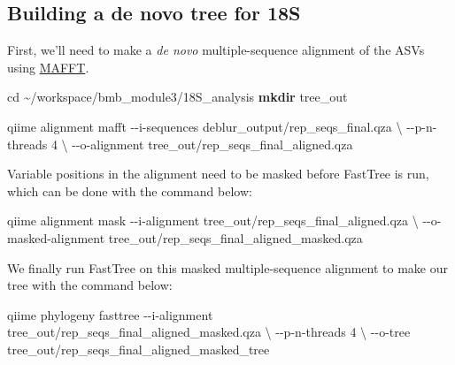 \documentclass[
]{book}
\newenvironment{Shaded}{\begin{snugshade}}{\end{snugshade}}
\newcommand{\AttributeTok}[1]{\textcolor[rgb]{0.13,0.29,0.53}{#1}}
\newcommand{\BuiltInTok}[1]{#1}
\newcommand{\DataTypeTok}[1]{\textcolor[rgb]{0.13,0.29,0.53}{#1}}
\newcommand{\ExtensionTok}[1]{#1}
\newcommand{\FunctionTok}[1]{\textcolor[rgb]{0.13,0.29,0.53}{\textbf{#1}}}
\newcommand{\NormalTok}[1]{#1}
\begin{document}
\subsection{Building a de novo tree for 18S}\label{building-a-de-novo-tree-for-18s}

First, we'll need to make a \emph{de novo} multiple-sequence alignment of the ASVs using \href{https://mafft.cbrc.jp/alignment/software/}{MAFFT}.

\begin{Shaded}
\begin{Highlighting}[]
\BuiltInTok{cd}\NormalTok{ \textasciitilde{}/workspace/bmb\_module3/18S\_analysis}
\FunctionTok{mkdir}\NormalTok{ tree\_out}

\ExtensionTok{qiime}\NormalTok{ alignment mafft }\AttributeTok{{-}{-}i{-}sequences}\NormalTok{ deblur\_output/rep\_seqs\_final.qza }\DataTypeTok{\textbackslash{}}
                      \AttributeTok{{-}{-}p{-}n{-}threads}\NormalTok{ 4 }\DataTypeTok{\textbackslash{}}
                      \AttributeTok{{-}{-}o{-}alignment}\NormalTok{ tree\_out/rep\_seqs\_final\_aligned.qza}
\end{Highlighting}
\end{Shaded}

Variable positions in the alignment need to be masked before FastTree is run, which can be done with the command below:

\begin{Shaded}
\begin{Highlighting}[]
\ExtensionTok{qiime}\NormalTok{ alignment mask }\AttributeTok{{-}{-}i{-}alignment}\NormalTok{  tree\_out/rep\_seqs\_final\_aligned.qza }\DataTypeTok{\textbackslash{}}
                     \AttributeTok{{-}{-}o{-}masked{-}alignment}\NormalTok{  tree\_out/rep\_seqs\_final\_aligned\_masked.qza}
\end{Highlighting}
\end{Shaded}

We finally run FastTree on this masked multiple-sequence alignment to make our tree with the command below:

\begin{Shaded}
\begin{Highlighting}[]
\ExtensionTok{qiime}\NormalTok{ phylogeny fasttree }\AttributeTok{{-}{-}i{-}alignment}\NormalTok{ tree\_out/rep\_seqs\_final\_aligned\_masked.qza }\DataTypeTok{\textbackslash{}}
                         \AttributeTok{{-}{-}p{-}n{-}threads}\NormalTok{ 4 }\DataTypeTok{\textbackslash{}}
                         \AttributeTok{{-}{-}o{-}tree}\NormalTok{ tree\_out/rep\_seqs\_final\_aligned\_masked\_tree}
\end{Highlighting}
\end{Shaded}
\end{document}
